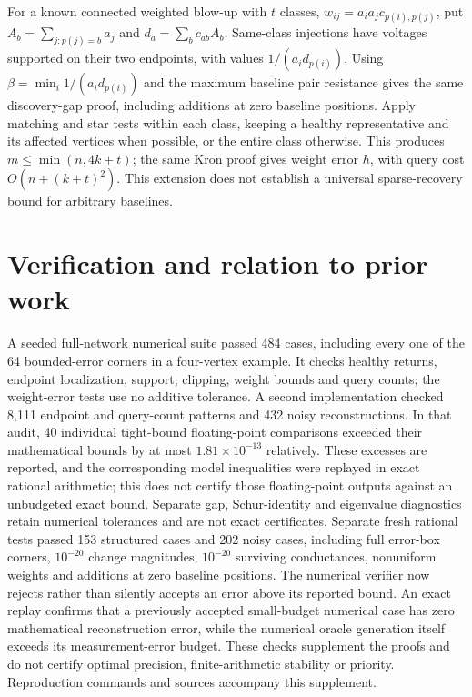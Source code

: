 \documentclass[11pt,letterpaper]{article}
\begin{document}
For a known connected weighted blow-up with $t$ classes, $w_{ij}=a_i a_jc_{p(i),p(j)}$, put $A_b=\sum_{j:p(j)=b}a_j$ and $d_a=\sum_b c_{ab}A_b$. Same-class injections have voltages supported on their two endpoints, with values $1/(a_i d_{p(i)})$. Using $\beta=\min_i1/(a_i d_{p(i)})$ and the maximum baseline pair resistance gives the same discovery-gap proof, including additions at zero baseline positions. Apply matching and star tests within each class, keeping a healthy representative and its affected vertices when possible, or the entire class otherwise. This produces $m\le\min(n,4k+t)$; the same Kron proof gives weight error $h$, with query cost $O(n+(k+t)^2)$. This extension does not establish a universal sparse-recovery bound for arbitrary baselines.

\section{Verification and relation to prior work}
A seeded full-network numerical suite passed 484 cases, including every one of the 64 bounded-error corners in a four-vertex example. It checks healthy returns, endpoint localization, support, clipping, weight bounds and query counts; the weight-error tests use no additive tolerance. A second implementation checked 8,111 endpoint and query-count patterns and 432 noisy reconstructions. In that audit, 40 individual tight-bound floating-point comparisons exceeded their mathematical bounds by at most $1.81\times10^{-13}$ relatively. These excesses are reported, and the corresponding model inequalities were replayed in exact rational arithmetic; this does not certify those floating-point outputs against an unbudgeted exact bound. Separate gap, Schur-identity and eigenvalue diagnostics retain numerical tolerances and are not exact certificates. Separate fresh rational tests passed 153 structured cases and 202 noisy cases, including full error-box corners, $10^{-20}$ change magnitudes, $10^{-20}$ surviving conductances, nonuniform weights and additions at zero baseline positions. The numerical verifier now rejects rather than silently accepts an error above its reported bound. An exact replay confirms that a previously accepted small-budget numerical case has zero mathematical reconstruction error, while the numerical oracle generation itself exceeds its measurement-error budget. These checks supplement the proofs and do not certify optimal precision, finite-arithmetic stability or priority. Reproduction commands and sources accompany this supplement.
\end{document}
